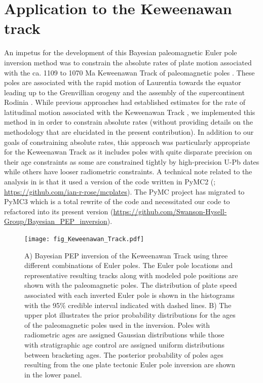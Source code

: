 \documentclass[11pt,letterpaper]{article}
\begin{document}
\section*{Application to the Keweenawan track}
\label{sec:keweenawan}

An impetus for the development of this Bayesian paleomagnetic Euler pole inversion method was to constrain the absolute rates of plate motion associated with the ca. 1109 to 1070 Ma Keweenawan Track of paleomagnetic poles \citep{Swanson-Hysell2019a}. These poles are associated with the rapid motion of Laurentia towards the equator leading up to the Grenvillian orogeny and the assembly of the supercontinent Rodinia \citep{Swanson-Hysell2021a}. While previous approaches had established estimates for the rate of latitudinal motion associated with the Keweenawan Track \citep{Davis1997a, Swanson-Hysell2014b}, we implemented this method in \citet{Swanson-Hysell2019a} in order to constrain absolute rates (without providing details on the methodology that are elucidated in the present contribution). In addition to our goals of constraining absolute rates, this approach was particularly appropriate for the Keweenawan Track as it includes poles with quite disparate precision on their age constraints as some are constrained tightly by high-precision U-Pb dates \citep[e.g.]{Fairchild2017a} while others have looser radiometric constraints. A technical note related to the analysis in \citet{Swanson-Hysell2019a} is that it used a version of the code written in PyMC2 (\citealp{}; \url{https://github.com/ian-r-rose/mcplates}). The PyMC project has migrated to PyMC3 which is a total rewrite of the code \citep{Salvatier2016a} and necessitated our code to refactored into its present version (\url{https://github.com/Swanson-Hysell-Group/Bayesian_PEP_inversion}). 

\begin{figure}
\begin{centering}
\texttt{[image: fig\_Keweenawan\_Track.pdf]}
\caption{A) Bayesian PEP inversion of the Keweenawan Track using three different combinations of Euler poles. The Euler pole locations and representative resulting tracks along with modeled pole positions are shown with the paleomagnetic poles. The distribution of plate speed associated with each inverted Euler pole is shown in the histograms with the 95$\%$ credible interval indicated with dashed lines. B) The upper plot illustrates the prior probability distributions for the ages of the paleomagnetic poles used in the inversion. Poles with radiometric ages are assigned Gaussian distributions while those with stratigraphic age control are assigned uniform distributions between bracketing ages. The posterior probability of poles ages resulting from the one plate tectonic Euler pole inversion are shown in the lower panel.}
\label{fig:Keweenawan_Track}
\end{centering}
\end{figure}
\end{document}
